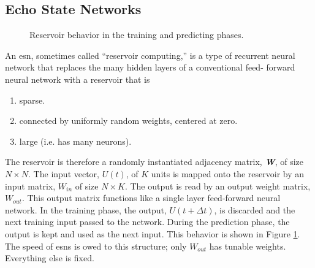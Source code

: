 \subsection{Echo State Networks}

\begin{figure}[htp]
  \centering


  \caption{Reservoir behavior in the training and predicting phases.}
  \label{fig:reservoir_graph}
\end{figure}

An \gls{esn}, sometimes called ``reservoir computing,'' is a type of recurrent
neural network that replaces the many hidden layers of a conventional feed-
forward neural network with a reservoir that is
\begin{enumerate}
  \item sparse.
  \item connected by uniformly random weights, centered at zero.
  \item large (i.e. has many neurons).
\end{enumerate}

The reservoir is therefore a randomly instantiated adjacency matrix,
\textit{\textbf{W}}, of size $N \times N$. The input vector, $U(t)$, of
$K$ units is mapped onto the reservoir by an input matrix,
 $W_{in}$ of size $N \times K$. The output is read by an output weight matrix,
 $W_{out}$. This output matrix functions like a single layer feed-forward
 neural network. In the training phase, the output, $U(t+\Delta t)$, is
 discarded and the next training input passed to the network. During the
 prediction phase, the output is kept and used as the next input. This behavior
 is shown in Figure \ref{fig:reservoir_graph}. The speed of \glspl{esn} is owed
 to this structure; only $W_{out}$ has tunable weights. Everything else is
 fixed.
